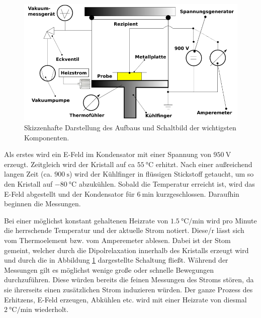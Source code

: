 \begin{figure}
    \centering
    \includegraphics[width=\textwidth]{Bilder/Zeichnung.PNG}
    \caption{Skizzenhafte Darstellung des Aufbaus und Schaltbild der wichtigsten Komponenten.\cite{V48}}
    \label{fig:skizze}
\end{figure}


Als erstes wird ein E-Feld im Kondensator mit einer Spannung von $\SI{950}{\volt}$ erzeugt. Zeitgleich wird der Kristall auf ca $\SI{55}{\celsius}$ erhitzt. Nach einer außreichend langen Zeit (ca. $\SI{900}{\second}$) wird der Kühlfinger in flüssigen Stickstoff getaucht, um so den Kristall auf $\SI{-80}{\celsius}$ abzukühlen. Sobald die Temperatur erreicht ist, wird das E-Feld abgestellt und der Kondensator für $\SI{6}{\minute}$ kurzgeschlossen. Daraufhin beginnen die Messungen.


Bei einer möglichst konstant gehaltenen Heizrate von $\SI{1.5}{\celsius\per\minute}$ wird pro Minute die herrschende Temperatur und der aktuelle Strom notiert. Diese/r lässt sich vom Thermoelement bzw. vom Amperemeter ablesen. Dabei ist der Stom gemeint, welcher durch die Dipolrelaxation innerhalb des Kristalls erzeugt wird und durch die in Abbildung \ref{fig:skizze} dargestellte Schaltung fließt. Während der Messungen gilt es möglichst wenige große oder schnelle Bewegungen durchzuführen. Diese würden bereits die feinen Messungen des Stroms stören, da sie ihrerseits einen zusätzlichen Strom induzieren würden. 
Der ganze Prozess des Erhitzens, E-Feld erzeugen, Abkühlen etc. wird mit einer Heizrate von diesmal $\SI{2}{\celsius\per\minute}$ wiederholt.

